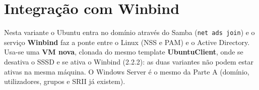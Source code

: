 
\clearpage
\section[Integração com Winbind]{Integração com Winbind}

\begin{notabox}[title={Nota}]
Nesta variante o Ubuntu entra no domínio através do Samba (\texttt{net ads join}) e o serviço \textbf{Winbind} faz a ponte entre o Linux (NSS e PAM) e o Active Directory. Usa-se uma \textbf{VM nova}, clonada do mesmo template \textbf{UbuntuClient}, onde se desativa o SSSD e se ativa o Winbind (2.2.2): as duas variantes não podem estar ativas na mesma máquina. O Windows Server é o mesmo da Parte A (domínio, utilizadores, grupos e SRII já existem).
\end{notabox}
